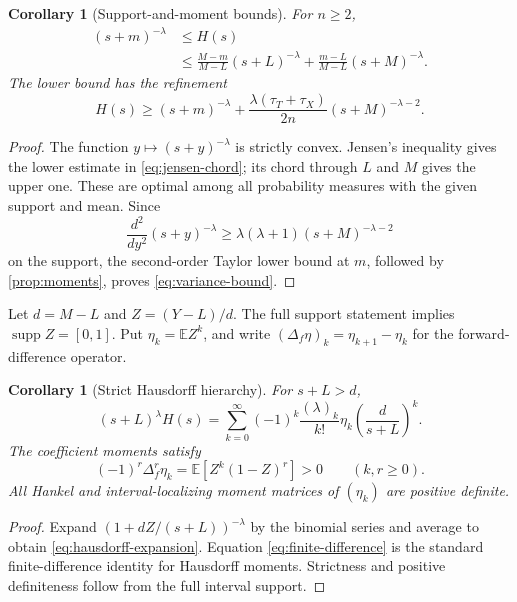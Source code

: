 \documentclass[11pt]{article}
\newtheorem{corollary}[theorem]{Corollary}
\theoremstyle{definition}
\theoremstyle{remark}
\newcommand{\E}{\mathbb{E}}
\newcommand{\supp}{\operatorname{supp}}
\begin{document}
\begin{corollary}[Support-and-moment bounds]
\label{cor:bounds}
For $n\ge2$,
\begin{align}
(s+m)^{-\lambda}
&\le H(s)\nonumber\\
&\le
\frac{M-m}{M-L}(s+L)^{-\lambda}
+\frac{m-L}{M-L}(s+M)^{-\lambda}.
\label{eq:jensen-chord}
\end{align}
The lower bound has the refinement
\begin{equation}\label{eq:variance-bound}
H(s)\ge
(s+m)^{-\lambda}
+\frac{\lambda(\tau_T+\tau_X)}{2n}(s+M)^{-\lambda-2}.
\end{equation}
\end{corollary}

\begin{proof}
The function $y\mapsto(s+y)^{-\lambda}$ is strictly convex.
Jensen's inequality gives the lower estimate in
\eqref{eq:jensen-chord}; its chord through $L$ and $M$ gives the upper one.
These are optimal among all probability measures with the given support and
mean. Since
\[
\frac{d^2}{dy^2}(s+y)^{-\lambda}
\ge\lambda(\lambda+1)(s+M)^{-\lambda-2}
\]
on the support, the second-order Taylor lower bound at $m$, followed by
\cref{prop:moments}, proves \eqref{eq:variance-bound}.
\end{proof}

Let $d=M-L$ and $Z=(Y-L)/d$. The full support statement implies
$\supp Z=[0,1]$. Put $\eta_k=\E Z^k$, and write
$(\Delta_f\eta)_k=\eta_{k+1}-\eta_k$ for the forward-difference operator.

\begin{corollary}[Strict Hausdorff hierarchy]
\label{cor:hausdorff}
For $s+L>d$,
\begin{equation}\label{eq:hausdorff-expansion}
(s+L)^\lambda H(s)
=\sum_{k=0}^\infty
(-1)^k\frac{(\lambda)_k}{k!}\eta_k
\left(\frac{d}{s+L}\right)^k.
\end{equation}
The coefficient moments satisfy
\begin{equation}\label{eq:finite-difference}
(-1)^r\Delta_f^r\eta_k
=\E[Z^k(1-Z)^r]>0
\qquad(k,r\ge0).
\end{equation}
All Hankel and interval-localizing moment matrices of $(\eta_k)$ are positive
definite.
\end{corollary}

\begin{proof}
Expand $(1+dZ/(s+L))^{-\lambda}$ by the binomial series and average to obtain
\eqref{eq:hausdorff-expansion}. Equation
\eqref{eq:finite-difference} is the standard finite-difference identity for
Hausdorff moments. Strictness and positive definiteness follow from the full
interval support.
\end{proof}
\end{document}
